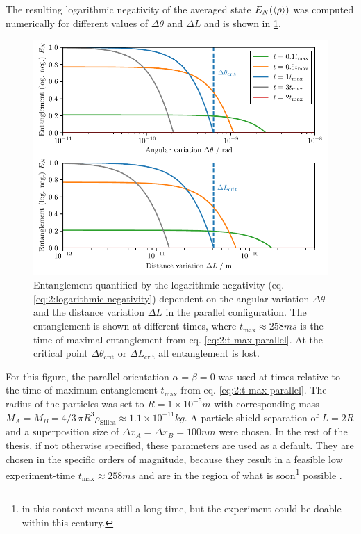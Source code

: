 The resulting logarithmic negativity of the averaged state $E_N(\left\langle\rho\right\rangle)$ was computed numerically for different values of $\Delta \theta$ and $\Delta L$ and is shown in \cref{fig:4:EN-delta-theta}.
\begin{figure}[!htb]
  \centering
  \includegraphics[width=\textwidth]{./../figures/theta-variance/EN-deltaTheta-deltaL.pdf}
  \caption{Entanglement quantified by the logarithmic negativity (eq. \eqref{eq:2:logarithmic-negativity}) dependent on the angular variation $\Delta\theta$ and the distance variation $\Delta L$ in the parallel configuration. The entanglement is shown at different times, where $t_\mathrm{max} \approx 258\si{ms}$ is the time of maximal entanglement from eq. \eqref{eq:2:t-max-parallel}. At the critical point $\Delta \theta_\mathrm{crit}$ or $\Delta L_\mathrm{crit}$ all entanglement is lost.}
  \label{fig:4:EN-delta-theta}
\end{figure}
For this figure, the parallel orientation $\alpha = \beta = 0$ was used at times relative to the time of maximum entanglement $t_\mathrm{max}$ from eq. \eqref{eq:2:t-max-parallel}.
The radius of the particles was set to $R=1\times 10^{-5}\si{m}$ with corresponding mass $M_A = M_B = 4/3\, \pi R^3 \rho_\mathrm{Silica} \approx 1.1\times 10^{-11}\si{kg}$.
A particle-shield separation of $L=2R$ and a superposition size of $\Delta x_A = \Delta x_B = 100\si{nm}$ were chosen.
In the rest of the thesis, if not otherwise specified, these parameters are used as a default.
They are chosen in the specific orders of magnitude, because they result in a feasible low experiment-time $t_\mathrm{max}\approx 258\si{ms}$ and are in the region of what is soon\footnote{ in this context means still a long time, but the experiment could be doable within this century.} possible \cite{Aspelmeyer_2024}.
